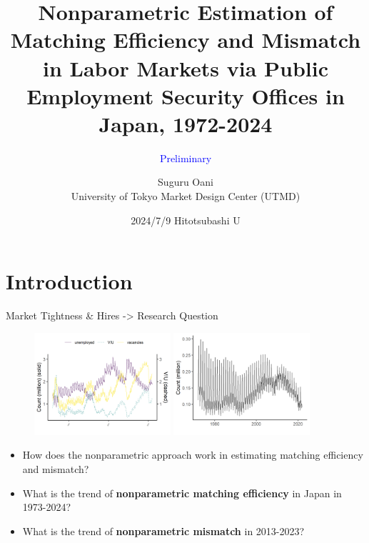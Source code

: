 \documentclass[aspectratio=169]{beamer}
\title{Nonparametric Estimation of Matching Efficiency and Mismatch in Labor Markets via Public Employment Security Offices in Japan, 1972-2024}
\date{2024/7/9 Hitotsubashi U}
\subtitle{\textcolor{blue}{Preliminary}}
\author{Suguru Oani\\ University of Tokyo Market Design Center (UTMD)}
\begin{document}
\maketitle

\section{Introduction}
\begin{frame}{Market Tightness \& Hires -> Research Question}
\begin{figure}[!ht]
  \begin{center}
  \includegraphics[width = 0.45\textwidth]
  {figuretable/unemployed_vacancy_month_aggregate.png}
  \includegraphics[width = 0.45\textwidth]
  {figuretable/hire_month_aggregate.png}
  \end{center}
  \footnotesize
\end{figure} 
\begin{itemize}\pause
    \item How does the nonparametric approach work in estimating matching efficiency and mismatch?
    \item What is the trend of \textbf{nonparametric matching efficiency} in Japan in 1973-2024?
    \item What is the trend of \textbf{nonparametric mismatch} in 2013-2023?
\end{itemize}
\end{frame}
\end{document}
